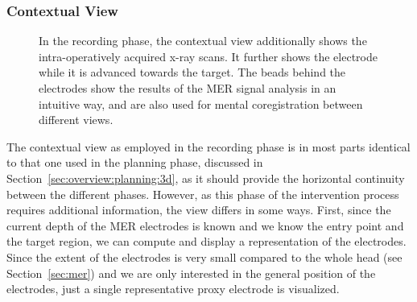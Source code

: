 \documentclass[journal]{vgtc}                %
\begin{document}
\subsubsection{Contextual View}\label{sec:overview:recording:3d}
\begin{figure}
    \centering
    \caption{In the recording phase, the contextual view additionally shows the intra-operatively acquired x-ray scans. It further shows the electrode while it is advanced towards the target. The beads behind the electrodes show the results of the MER signal analysis in an intuitive way, and are also used for mental coregistration between different views.}
    \label{fig:recordingphase:3d}
\end{figure}

The contextual view as employed in the recording phase is in most parts identical to that one used in the planning phase, discussed in Section~\ref{sec:overview:planning:3d}, as it should provide the horizontal continuity between the different phases. However, as this phase of the intervention process requires additional information, the view differs in some ways. First, since the current depth of the MER electrodes is known and we know the entry point and the target region, we can compute and display a representation of the electrodes. Since the extent of the electrodes is very small compared to the whole head (see Section~\ref{sec:mer}) and we are only interested in the general position of the electrodes, just a single representative proxy electrode is visualized. 
\end{document}
